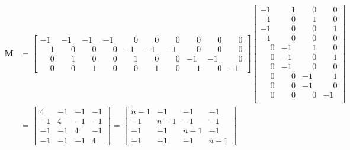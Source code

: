 \documentclass{article}
\begin{document}
\begin{align*}
     \mathbf{M} &= 
    \begin{bmatrix}
       -1 & - 1 & -1 & -1  & \phantom{-}0 & \phantom{-}0 & \phantom{-}0 & \phantom{-}0 & \phantom{-}0 & \phantom{-}0 \\
        \phantom{-}1 & \phantom{-}0 & \phantom{-}0 & \phantom{-}0 & -1 & - 1 & -1 & \phantom{-}0 & \phantom{-}0 & \phantom{-}0 \\
        \phantom{-}0 & \phantom{-}1 & \phantom{-}0 & \phantom{-}0  & \phantom{-}1 & \phantom{-}0 & \phantom{-}0 & -1 & -1 & \phantom{-}0 \\
        \phantom{-}0 & \phantom{-}0 & \phantom{-}1 & \phantom{-}0  & \phantom{-}0 & \phantom{-}1 & \phantom{-}0 & \phantom{-}1 & \phantom{-}0 & -1      
    \end{bmatrix}
    \begin{bmatrix}
    -1& \phantom{-}1 & \phantom{-}0  & \phantom{-}0 \\
    -1 & \phantom{-}0 & \phantom{-}1  & \phantom{-}0 \\
    -1 & \phantom{-}0 & \phantom{-}0 & \phantom{-}1 \\
    -1 & \phantom{-}0 & \phantom{-}0 & \phantom{-}0 \\
    \phantom{-}0 & -1 & \phantom{-}1 & \phantom{-}0 \\
    \phantom{-}0 & -1 & \phantom{-}0 & \phantom{-}1 \\
    \phantom{-}0 & -1 & \phantom{-}0 & \phantom{-}0 \\
    \phantom{-}0 & \phantom{-}0 & -1 & \phantom{-}1 \\
    \phantom{-}0 & \phantom{-}0 & -1 & \phantom{-}0 \\
    \phantom{-}0 & \phantom{-}0 & \phantom{-}0 & -1 \\
    \end{bmatrix} \\[1mm]
    &= \begin{bmatrix}
        4 & -1 & -1 & -1 \\
        -1 & 4 & -1 & -1 \\
        -1 & -1 & 4 & -1 \\
        -1 & -1 & -1 & 4
    \end{bmatrix} =
    \begin{bmatrix}
        n - 1& -1 & -1 & -1 \\
        -1 & n - 1 & -1 & -1 \\
        -1 & -1 & n -1& -1 \\
        -1 & -1 & -1 & n-1
    \end{bmatrix}
\end{align*}
\end{document}
